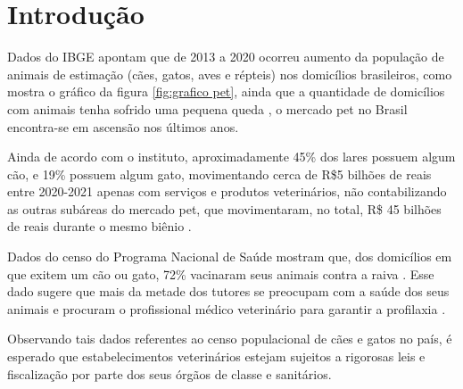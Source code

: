 \documentclass[
    12pt,               %
    openright,          %
    oneside,
    a4paper,            %
    BIBLATEX,           %
    TODO,               %
    english,            %
    brazil              %
    ]{ifsp-spo-inf-ctds}
\begin{document}
 
\frenchspacing 

\pretextual

\imprimirfolhaderosto

\listoffigures*
\cleardoublepage

\listoftables*
\cleardoublepage

\listofquadros*
\cleardoublepage


\tableofcontents*
\textual
\chapter[Introdução]{Introdução}
    
    Dados do IBGE apontam que de 2013 a 2020 ocorreu aumento da população de animais de estimação (cães, gatos, aves e répteis) nos domicílios brasileiros, como mostra o gráfico da figura \ref{fig:grafico pet}, ainda que a quantidade de domicílios com animais tenha sofrido uma pequena queda \cite{ibge2013} \cite{pet2021}, o mercado pet no Brasil encontra-se em ascensão nos últimos anos.
    
    Ainda de acordo com o instituto, aproximadamente 45\% dos lares possuem algum cão, e 19\% possuem algum gato,\cite{cao2019,} \cite{gato2019} movimentando cerca de R\$5 bilhões de reais entre 2020-2021 apenas com serviços e produtos veterinários, não contabilizando as outras subáreas do mercado pet, que movimentaram, no total, R\$ 45 bilhões de reais durante o mesmo biênio \cite{pet2021}.
    
    Dados do censo do Programa Nacional de Saúde mostram que, dos domicílios em que exitem um cão ou gato, 72\% vacinaram seus animais contra a raiva \cite{vacina2019}. Esse dado sugere que mais da metade dos tutores se preocupam com a saúde dos seus animais e procuram o profissional médico veterinário para garantir a profilaxia \cite{vacina2019}.
     
    Observando tais dados referentes ao censo populacional de cães e gatos no país, é esperado que estabelecimentos veterinários estejam sujeitos a rigorosas leis e fiscalização por parte dos seus órgãos de classe e sanitários.
    
\end{document}
